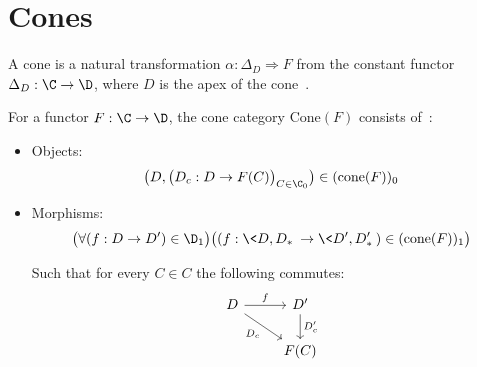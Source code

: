 \section{Cones}

\begin{definition}[Cone]
  A cone is a natural transformation $\alpha: \Delta_D \Rightarrow F$ from the
	constant functor $\Delta_D:\C\to \D$, where $D$ is the apex of the
	cone~\parencite[p.~118]{leinster:basic_category_theory}.
\end{definition}

\begin{definition}
  For a functor $F:\C\to \D$, the cone category $\mathrm{Cone}(F)$ consists
  of~\parencite[p.~75]{riehl:category_theory_in_context}:
  \begin{itemize}
    \item Objects:
      \[\big(D, \big(D_c: D \to F(C)\big)_{C\in \C_0}\big)\in
        (\mathrm{cone}(F))_0\]
    \item Morphisms:
      \[\big(\forall (f : D \to D') \in \D_1\big)
        \big((f: \<D, D_*\>\to \<D', D'_*\>) \in (\mathrm{cone}(F))_1\big)\]

      Such that for every $C\in C$ the following commutes:
      \[\begin{tikzcd}[ampersand replacement=\&]
        D \& {D'} \\
        \& {F(C)}
        \arrow["{D_c}"', from=1-1, to=2-2]
        \arrow["{D'_c}", from=1-2, to=2-2]
        \arrow["f", from=1-1, to=1-2]
      \end{tikzcd}\]
  \end{itemize}
\end{definition}